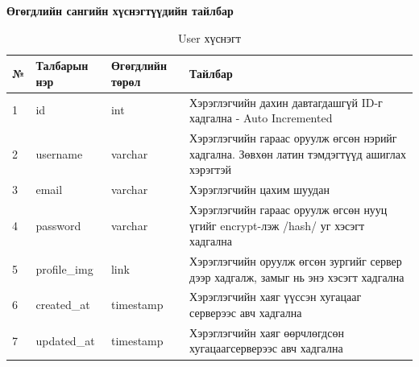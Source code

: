 \pagebreak
\textbf{Өгөгдлийн сангийн хүснэгтүүдийн тайлбар}

\begin{table}[h]
	\caption{User хүснэгт}
	\begin{tabular}{|l|l|l|p{8cm}|}
		\hline
		№ & Талбарын нэр & Өгөгдлийн төрөл & Тайлбар                                                                                    \\ \hline
		1 & id           & int             & Хэрэглэгчийн дахин давтагдашгүй ID-г хадгална - Auto Incremented                           \\ \hline
		2 & username     & varchar         & Хэрэглэгчийн гараас оруулж өгсөн нэрийг хадгална. Зөвхөн латин тэмдэгтүүд ашиглах хэрэгтэй \\ \hline
		3 & email        & varchar         & Хэрэглэгчийн цахим шуудан                                                                  \\ \hline
		4 & password     & varchar         & Хэрэглэгчийн гараас оруулж өгсөн нууц үгийг encrypt-лэж /hash/ уг хэсэгт хадгална          \\ \hline
		5 & profile\_img & link            & Хэрэглэгчийн оруулж өгсөн зургийг сервер дээр хадгалж, замыг нь энэ хэсэгт хадгална        \\ \hline
		6 & created\_at  & timestamp       & Хэрэглэгчийн хаяг үүссэн хугацааг серверээс авч хадгална                                   \\ \hline
		7 & updated\_at  & timestamp       & Хэрэглэгчийн хаяг өөрчлөгдсөн хугацаагсерверээс авч хадгална                               \\ \hline
	\end{tabular}
\end{table}

